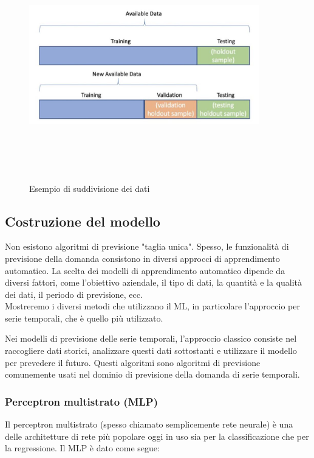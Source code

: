 \documentclass[12pt,a4paper]{report}
\begin{document}
\begin{figure}[h!]
    \begin{center}
        \includegraphics[width=10cm,height=10cm,keepaspectratio]{Data_forecast}
    \end{center}
    \caption{Esempio di suddivisione dei dati}
    \label{fig:data-split-forecast}
\end{figure}


\subsection{Costruzione del modello}
Non esistono algoritmi di previsione "taglia unica". Spesso, le funzionalità di previsione della domanda consistono in diversi approcci di apprendimento automatico. La scelta dei modelli di apprendimento automatico dipende da diversi fattori, come l'obiettivo aziendale, il tipo di dati, la quantità e la qualità dei dati, il periodo di previsione, ecc.\\
Mostreremo i diversi metodi che utilizzano il ML, in particolare l'approccio per serie temporali, che è quello più utilizzato.

Nei modelli di previsione delle serie temporali, l'approccio classico consiste nel raccogliere dati storici, analizzare questi dati sottostanti e utilizzare il modello per prevedere il futuro. Questi algoritmi sono algoritmi di previsione comunemente usati nel dominio di previsione della domanda di serie temporali.

\subsubsection{Perceptron multistrato (MLP)}
Il perceptron multistrato (spesso chiamato semplicemente rete neurale) è una delle architetture di rete più popolare oggi in uso sia per la classificazione che per la regressione. Il MLP è dato come segue:
\end{document}
